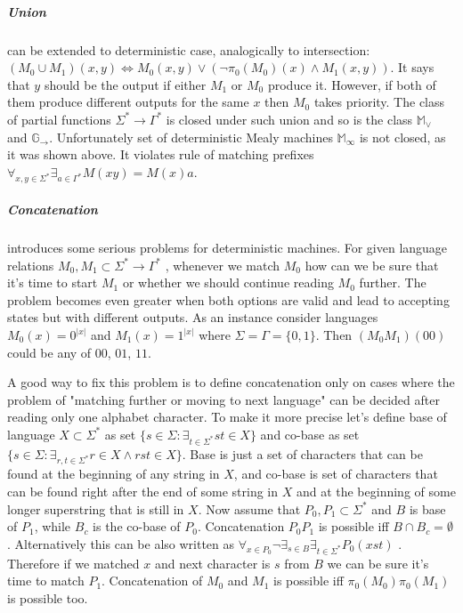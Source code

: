 \documentclass[12pt]{article}
\begin{document}
\subparagraph{Union}  can be extended to deterministic case, analogically to intersection: $(M_0 \cup M_1)(x,y) \iff M_0(x,y) \vee (\neg \pi_0(M_0)(x) \wedge M_1(x,y))$. It says that $y$ should be the output if either $M_1$ or $M_0$ produce it. However, if both of them produce different outputs for the same $x$ then $M_0$ takes priority. The class of partial functions $\Sigma^* \rightarrow \Gamma^*$ is closed  under such union and so is the class $\mathbb{M}_\vee$ and $\mathbb{G}_\rightarrow$. Unfortunately set of deterministic Mealy machines $\mathbb{ M}_\infty$ is not closed, as it was shown above. It violates rule of matching prefixes $\forall_{x,y\in \Sigma^*} \exists_{a \in \Gamma^* } M(xy)=M(x)a$. 

\subparagraph{Concatenation}  introduces some serious problems for deterministic machines. For given language relations $M_0,M_1 \subset \Sigma^* \rightarrow \Gamma^* $ , whenever we match $M_0$ how can we be sure that it's time to start $M_1$ or whether we should continue reading $M_0$ further. The problem becomes even greater when both options are valid and lead to accepting states but with different outputs. As an instance consider languages $M_0(x) =  0^{\vert x \vert} $ and $M_1(x) =  1^{\vert x \vert} $ where $\Sigma=\Gamma=\{0,1\}$. Then $(M_0M_1)(00)$ could be any of $00$, $01$, $11$. 


A good way to fix this problem is to define concatenation only on cases where the problem of "matching further or moving to next language" can be decided after reading only one alphabet character. To make it more precise let's define base of language $X \subset \Sigma^*$ as set $\{s\in\Sigma : \exists_{t\in\Sigma^*}st\in X\}$ and co-base as set  $\{s\in\Sigma : \exists_{r,t\in\Sigma^*}r\in X \wedge rst\in X\}$. Base is just a set of characters that can be found at the beginning of any string in $X$, and co-base is set of characters that can be found right after the end of some string in $X$ and at the beginning of some longer superstring that is still in $X$. Now assume that $P_0,P_1 \subset \Sigma^*$ and $B$ is base of $P_1$, while $B_c$ is the co-base of $P_0$. Concatenation $P_0P_1$ is possible iff $B\cap B_c = \emptyset$. Alternatively this can be also written as $\forall_{x\in P_0} \neg \exists_{s\in B} \exists_{t\in\Sigma^*} P_0(xst)$ . Therefore if we matched $x$ and next character is $s$ from $B$ we can be sure it's time to match $P_1$. Concatenation of $M_0$ and $M_1$ is possible iff $\pi_0(M_0)\pi_0(M_1)$ is possible too. 
\end{document}
